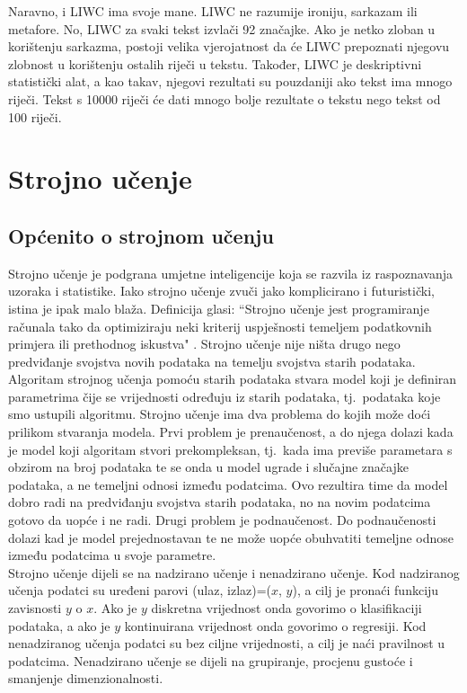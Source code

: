 \documentclass[times,utf8,zavrsni]{fer}
\begin{document}
Naravno, i LIWC ima svoje mane. LIWC ne razumije ironiju, sarkazam ili metafore. No, LIWC za svaki tekst izvlači 92 značajke. Ako je netko zloban u korištenju sarkazma, postoji velika vjerojatnost da će LIWC prepoznati njegovu zlobnost u korištenju ostalih riječi u tekstu. Također, LIWC je deskriptivni statistički alat, a kao takav, njegovi rezultati su pouzdaniji ako tekst ima mnogo riječi. Tekst s 10000 riječi će dati mnogo bolje rezultate o tekstu nego tekst od 100 riječi. \\

\newpage
\section{Strojno učenje}
\subsection{Općenito o strojnom učenju}
Strojno učenje je podgrana umjetne inteligencije koja se razvila iz raspoznavanja uzoraka i statistike. Iako strojno učenje zvuči jako komplicirano i futuristički, istina je ipak malo blaža. Definicija glasi: ``Strojno učenje jest programiranje računala tako da optimiziraju neki kriterij uspješnosti temeljem podatkovnih primjera ili prethodnog iskustva" \citep{machine}. Strojno učenje nije ništa drugo nego predviđanje svojstva novih podataka na temelju svojstva starih podataka. \\

Algoritam strojnog učenja pomoću starih podataka stvara model koji je definiran parametrima čije se vrijednosti određuju iz starih podataka, tj.~podataka koje smo ustupili algoritmu. Strojno učenje ima dva problema do kojih može doći prilikom stvaranja modela. Prvi problem je prenaučenost, a do njega dolazi kada je model koji algoritam stvori prekompleksan, tj.~kada ima previše parametara s obzirom na broj podataka te se onda u model ugrade i slučajne značajke podataka, a ne temeljni odnosi između podatcima. Ovo rezultira time da model dobro radi na predviđanju svojstva starih podataka, no na novim podatcima gotovo da uopće i ne radi. Drugi problem je podnaučenost. Do podnaučenosti dolazi kad je model prejednostavan te ne može uopće obuhvatiti temeljne odnose između podatcima u svoje parametre. \\

Strojno učenje dijeli se na nadzirano učenje i nenadzirano učenje. Kod nadziranog učenja podatci su uređeni parovi (ulaz, izlaz)=($x$, $y$), a cilj je pronaći funkciju zavisnosti $y$ o $x$. Ako je $y$ diskretna vrijednost onda govorimo o klasifikaciji podataka, a ako je $y$ kontinuirana vrijednost onda govorimo o regresiji. Kod nenadziranog učenja podatci su bez ciljne vrijednosti, a cilj je naći pravilnost u podatcima. Nenadzirano učenje se dijeli na grupiranje, procjenu gustoće i smanjenje dimenzionalnosti.
\end{document}
